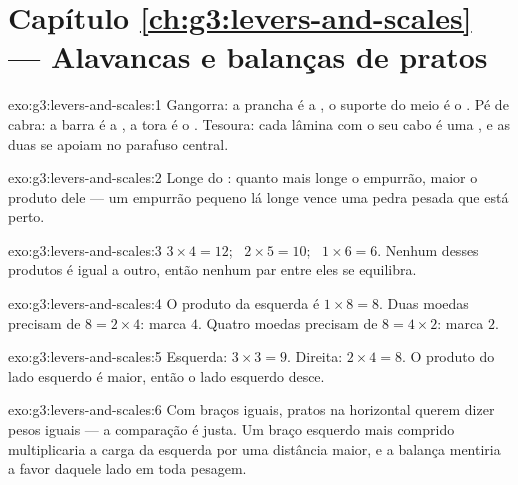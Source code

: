 \section*{Capítulo \ref{ch:g3:levers-and-scales} --- Alavancas e balanças de pratos}

\begin{solution}{exo:g3:levers-and-scales:1}
Gangorra: a prancha é a , o suporte do meio é o . Pé de cabra: a barra é a , a tora é o .
Tesoura: cada lâmina com o seu cabo é uma , e as duas se
apoiam no parafuso central.
\end{solution}

\begin{solution}{exo:g3:levers-and-scales:2}
Longe do : quanto mais longe o empurrão, maior o
produto dele --- um empurrão pequeno lá longe vence uma pedra pesada
que está perto.
\end{solution}

\begin{solution}{exo:g3:levers-and-scales:3}
$3 \times 4 = 12$; \ $2 \times 5 = 10$; \ $1 \times 6 = 6$. Nenhum
desses produtos é igual a outro, então nenhum par entre eles se
equilibra.
\end{solution}

\begin{solution}{exo:g3:levers-and-scales:4}
O produto da esquerda é $1 \times 8 = 8$. Duas moedas precisam de
$8 = 2 \times 4$: marca $4$. Quatro moedas precisam de
$8 = 4 \times 2$: marca $2$.
\end{solution}

\begin{solution}{exo:g3:levers-and-scales:5}
Esquerda: $3 \times 3 = 9$. Direita: $2 \times 4 = 8$. O produto do
lado esquerdo é maior, então o lado esquerdo desce.
\end{solution}

\begin{solution}{exo:g3:levers-and-scales:6}
Com braços iguais, pratos na horizontal querem dizer pesos iguais ---
a comparação é justa. Um braço esquerdo mais comprido multiplicaria a
carga da esquerda por uma distância maior, e a balança mentiria a
favor daquele lado em toda pesagem.
\end{solution}

